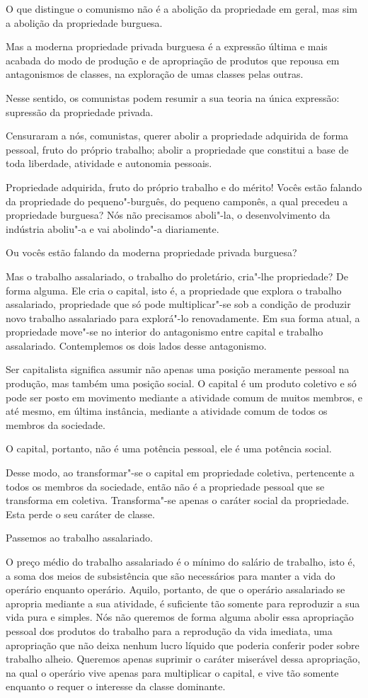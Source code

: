 O que distingue o comunismo não é a abolição da propriedade em geral,
mas sim a abolição da propriedade burguesa.

Mas a moderna propriedade privada burguesa é a expressão última e mais
acabada do modo de produção e de apropriação de produtos que repousa em
antagonismos de classes, na exploração de umas classes pelas outras.

Nesse sentido, os comunistas podem resumir a sua teoria na única
expressão: supressão da propriedade privada.

Censuraram a nós, comunistas, querer abolir a propriedade adquirida de
forma pessoal, fruto do próprio trabalho; abolir a propriedade que
constitui a base de toda liberdade, atividade e autonomia pessoais.

Propriedade adquirida, fruto do próprio trabalho e do mérito! Vocês
estão falando da propriedade do pequeno"-burguês, do pequeno camponês,
a qual precedeu a propriedade burguesa? Nós não precisamos aboli"-la,
o desenvolvimento da indústria aboliu"-a e vai abolindo"-a
diariamente.

Ou vocês estão falando da moderna propriedade privada burguesa?

Mas o trabalho assalariado, o trabalho do proletário, cria"-lhe
propriedade? De forma alguma. Ele cria o capital, isto é, a propriedade
que explora o trabalho assalariado, propriedade que só pode
multiplicar"-se sob a condição de produzir novo trabalho assalariado
para explorá"-lo renovadamente. Em sua forma atual, a propriedade
move"-se no interior do antagonismo entre capital e trabalho
assalariado. Contemplemos os dois lados desse antagonismo.

Ser capitalista significa assumir não apenas uma posição meramente
pessoal na produção, mas também uma posição social. O capital é um
produto coletivo e só pode ser posto em movimento mediante a atividade
comum de muitos membros, e até mesmo, em última instância, mediante a
atividade comum de todos os membros da sociedade.

O capital, portanto, não é uma potência pessoal, ele é uma potência
social.

Desse modo, ao transformar"-se o capital em propriedade coletiva,
pertencente a todos os membros da sociedade, então não é a propriedade
pessoal que se transforma em coletiva. Transforma"-se apenas o caráter
social da propriedade. Esta perde o seu caráter de classe.

Passemos ao trabalho assalariado.

O preço médio do trabalho assalariado é o mínimo do salário de trabalho,
isto é, a soma dos meios de subsistência que são necessários para
manter a vida do operário enquanto operário. Aquilo, portanto, de que o
operário assalariado se apropria mediante a sua atividade, é suficiente
tão somente para reproduzir a sua vida pura e simples. Nós não
queremos de forma alguma abolir essa apropriação pessoal dos produtos
do trabalho para a reprodução da vida imediata, uma apropriação que não
deixa nenhum lucro líquido que poderia conferir poder sobre trabalho
alheio. Queremos apenas suprimir o caráter miserável dessa apropriação,
na qual o operário vive apenas para multiplicar o capital, e vive
tão somente enquanto o requer o interesse da classe dominante.

